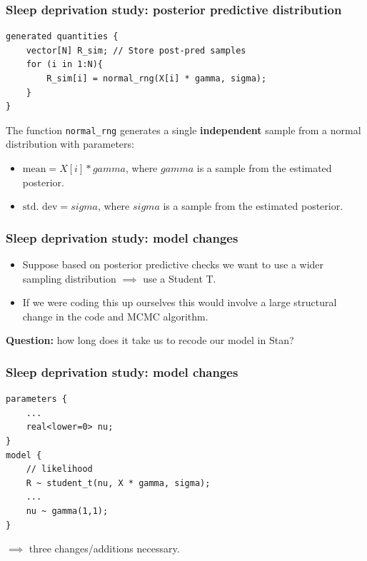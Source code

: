 \documentclass[handout]{beamer}
\begin{document}
\begin{frame}[fragile]
	\frametitle{Sleep deprivation study: posterior predictive distribution}
    \begin{verbatim}
generated quantities {
	vector[N] R_sim; // Store post-pred samples
	for (i in 1:N){
        R_sim[i] = normal_rng(X[i] * gamma, sigma);
    }
}
	\end{verbatim}
	
 The function \texttt{normal_rng} generates a single \textbf{independent} sample from a normal distribution with parameters:

\begin{itemize}
	\item<3-> $\text{mean} = X[i] * gamma$, where $gamma$ is a sample from the estimated posterior.
	\item<4-> $\text{std. dev} = sigma$, where $sigma$ is a sample from the estimated posterior. 
\end{itemize}
\end{frame}

\begin{frame}[fragile]
	\frametitle{Sleep deprivation study: model changes}
	\begin{itemize}
		\item<2-> Suppose based on posterior predictive checks we want to use a wider sampling distribution $\implies$ use a Student T.
		\item<3-> If we were coding this up ourselves this would involve a large structural change in the code and MCMC algorithm.
	\end{itemize}
	
	\textbf{Question:} how long does it take us to recode our model in Stan?
	

\end{frame}

\begin{frame}[fragile]
	\frametitle{Sleep deprivation study: model changes}
	\begin{verbatim}
parameters {
    ...
    real<lower=0> nu;
} 
model {
    // likelihood
    R ~ student_t(nu, X * gamma, sigma);
    ...
    nu ~ gamma(1,1);
}
	\end{verbatim}
 $\implies$ three changes/additions necessary.
	
\end{frame}
\end{document}
